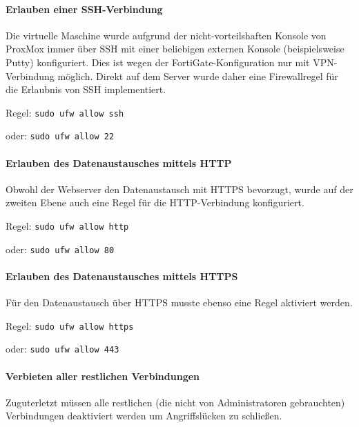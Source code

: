 \hypertarget{erlauben-einer-ssh-verbindung}{%
\paragraph{Erlauben einer
SSH-Verbindung}\label{erlauben-einer-ssh-verbindung}}

Die virtuelle Maschine wurde aufgrund der nicht-vorteilshaften Konsole
von ProxMox immer über SSH mit einer beliebigen externen Konsole
(beispielsweise Putty) konfiguriert. Dies ist wegen der
FortiGate-Konfiguration nur mit VPN-Verbindung möglich. Direkt auf dem
Server wurde daher eine Firewallregel für die Erlaubnis von SSH
implementiert.

Regel: \texttt{sudo\ ufw\ allow\ ssh}

oder: \texttt{sudo\ ufw\ allow\ 22}

\hypertarget{erlauben-des-datenaustausches-mittels-http}{%
\paragraph{Erlauben des Datenaustausches mittels
HTTP}\label{erlauben-des-datenaustausches-mittels-http}}

Obwohl der Webserver den Datenaustausch mit HTTPS bevorzugt, wurde auf
der zweiten Ebene auch eine Regel für die HTTP-Verbindung konfiguriert.

Regel: \texttt{sudo\ ufw\ allow\ http}

oder: \texttt{sudo\ ufw\ allow\ 80}

\hypertarget{erlauben-des-datenaustausches-mittels-https}{%
\paragraph{Erlauben des Datenaustausches mittels
HTTPS}\label{erlauben-des-datenaustausches-mittels-https}}

Für den Datenaustausch über HTTPS musste ebenso eine Regel aktiviert
werden.

Regel: \texttt{sudo\ ufw\ allow\ https}

oder: \texttt{sudo\ ufw\ allow\ 443}

\hypertarget{verbieten-aller-restlichen-verbindungen}{%
\paragraph{Verbieten aller restlichen
Verbindungen}\label{verbieten-aller-restlichen-verbindungen}}

Zuguterletzt müssen alle restlichen (die nicht von Administratoren
gebrauchten) Verbindungen deaktiviert werden um Angriffslücken zu
schließen.

